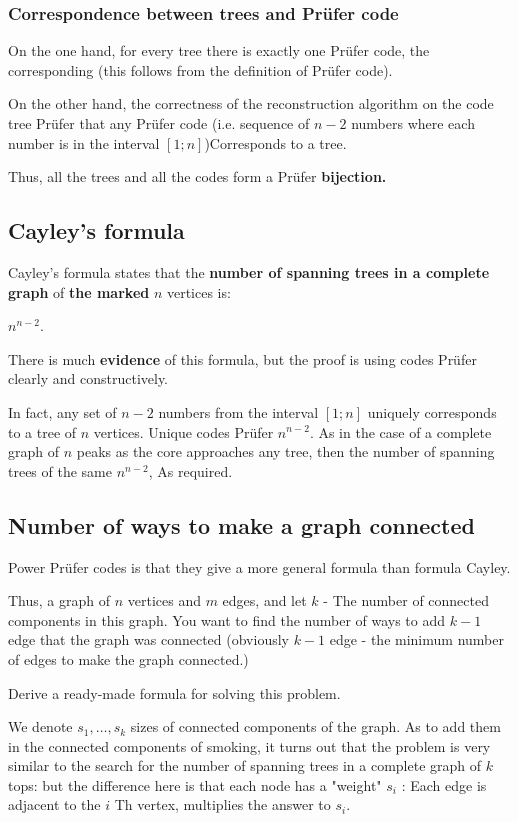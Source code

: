 \subsubsection{ Correspondence between trees and Prüfer code }

On the one hand, for every tree there is exactly one Prüfer code, the corresponding (this follows from the definition of Prüfer code).

On the other hand, the correctness of the reconstruction algorithm on the code tree Prüfer that any Prüfer code (i.e. sequence of $n-2$ numbers where each number is in the interval $[1; n]$)Corresponds to a tree.

Thus, all the trees and all the codes form a Prüfer \textbf{bijection.}

\subsection{ Cayley's formula }

Cayley's formula states that the \textbf{number of spanning trees in a complete graph} of \textbf{the marked} $n$ vertices is:

$n ^ {n-2}.$

There is much \textbf{evidence} of this formula, but the proof is using codes Prüfer clearly and constructively.

In fact, any set of $n-2$ numbers from the interval $[1; n]$ uniquely corresponds to a tree of $n$ vertices. Unique codes Prüfer $n ^ {n-2}$. As in the case of a complete graph of $n$ peaks as the core approaches any tree, then the number of spanning trees of the same $n ^ {n-2}$, As required.

\subsection{ Number of ways to make a graph connected }

Power Prüfer codes is that they give a more general formula than formula Cayley.

Thus, a graph of $n$ vertices and $m$ edges, and let $k$ - The number of connected components in this graph. You want to find the number of ways to add $k-1$ edge that the graph was connected (obviously $k-1$ edge - the minimum number of edges to make the graph connected.)

Derive a ready-made formula for solving this problem.

We denote $s_1, \ldots, s_k$ sizes of connected components of the graph. As to add them in the connected components of smoking, it turns out that the problem is very similar to the search for the number of spanning trees in a complete graph of $k$ tops: but the difference here is that each node has a "weight" $s_i$ : Each edge is adjacent to the $i$ Th vertex, multiplies the answer to $s_i$.

